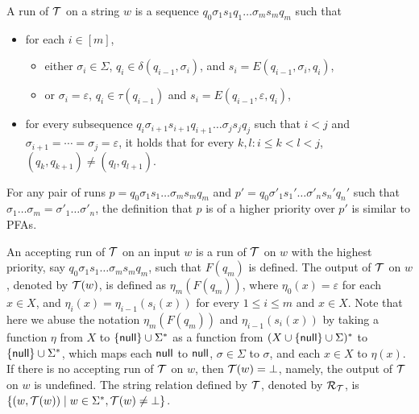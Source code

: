 A run of $\mathcal{T}$ on a string $w$ is a sequence $q_0 \sigma_1 s_1 q_1 \ldots \sigma_m s_m q_m$ such that
\begin{itemize}
%
\item for each $i \in [m]$, 
\begin{itemize}
\item either $\sigma_i \in \Sigma$, $q_i \in \delta (q_{i-1}, \sigma_i)$, and $s_i = E (q_{i - 1}, \sigma_i, q_i)$, 
\item or $\sigma_i = \varepsilon$, $q_i \in \tau(q_{i-1})$ and $s_i = E (q_{i - 1}, \varepsilon, q_i)$,
\end{itemize}

\item for every subsequence $q_i \sigma_{i+1} s_{i+1} q_{i+1} \ldots \sigma_{j} s_j q_j$ such that  $i < j$ and $\sigma_{i+1} = \cdots = \sigma_j = \varepsilon$,  it holds that for every $k, l: i \le k < l < j$, $(q_k, q_{k+1}) \neq (q_l, q_{l+1})$.
\end{itemize}

For any pair of runs $p = q_0 \sigma_1 s_1 \ldots \sigma_m s_m q_m$ and $p' = q_0 \sigma'_1
  s_1' \ldots \sigma'_n s_n' q_n'$ such that $\sigma_1 \ldots \sigma_m = \sigma'_1 \ldots \sigma'_n$, the definition that $p$ is of a higher priority over
  $p'$ is similar to PFAs.
  
An accepting run of $\mathcal{T}$ on an input $w$ is a run of $\mathcal{T}$ on $w$ with the highest priority, say $q_0 \sigma_1 s_1 \ldots \sigma_m s_m q_m$, such that $F(q_m)$ is defined. The output of $\mathcal{T}$ on $w$, denoted by $\mathcal{T}(w)$, is defined as $\eta_m(F(q_m))$, where $\eta_0(x) = \varepsilon$ for each $x \in X$, and $\eta_{i}(x) = \eta_{i-1}(s_{i}(x))$ for every $1 \le i \le m$ and $x \in X$. Note that here we abuse the notation $\eta_m(F(q_m))$ and $\eta_{i-1}(s_{i}(x))$ by taking a function $\eta$ from $X$ to $\{\mathsf{null}\} \cup \Sigma^*$ as a function from $(X \cup \{\mathsf{null}\} \cup \Sigma)^*$ to $\{\mathsf{null}\} \cup \Sigma^*$, which maps each $\mathsf{null}$ to $\mathsf{null}$, $\sigma \in \Sigma$ to $\sigma$, and each $x \in X$ to $\eta(x)$. If there is no accepting run of $\mathcal{T}$ on $w$, then $\mathcal{T}(w) = \bot$, namely, the output of $\mathcal{T}$ on $w$ is undefined. The string relation defined by $\mathcal{T}$, denoted by $\mathcal{R}_{\mathcal{T}}$,  is $\{(w, \mathcal{T}(w)) \mid w \in \Sigma^\ast, \mathcal{T}(w) \neq \bot\}$.

